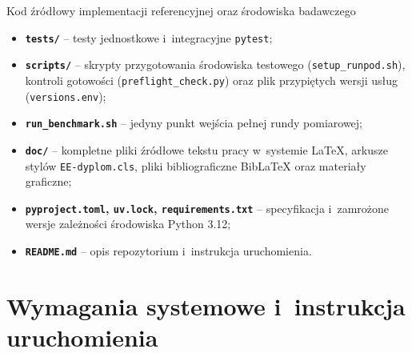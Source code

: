 \begin{easyappendix}{Kod źródłowy implementacji referencyjnej oraz środowiska badawczego}
\begin{itemize}
    \begin{itemize}
        \item \texttt{scenarios/} -- pomocnicze scenariusze pomiarowe opisane w~Rozdziale~\ref{chap:wyniki}: A (selekcja schematu i~Text-to-SQL, ablacja $M_{\text{exp}}$, czas do pierwszego tokenu, dryf schematu), B1 (transfer Out-of-Band), B2 (paginacja keyset i~postać predykatu), C1 (obciążenie współbieżne walidatora) oraz D (bezpieczeństwo);
        \item \texttt{config/benchmark\_config.json} -- jedyne źródło konfiguracji rundy (liczności, ziarna, profile modeli);
        \item \texttt{analysis\_final/}, \texttt{analysis\_offline/} -- skrypty analiz wyników rundy i~analiz wtórnych, generujące makra liczbowe pracy;
        \item \texttt{plot\_generators/} -- zautomatyzowane skrypty generujące wykresy wektorowe PDF prezentowane w~rozdziale badawczym.
    \end{itemize}
    \item \textbf{\texttt{tests/}} -- testy jednostkowe i~integracyjne \texttt{pytest};
    \item \textbf{\texttt{scripts/}} -- skrypty przygotowania środowiska testowego (\texttt{setup\_runpod.sh}), kontroli gotowości (\texttt{preflight\_check.py}) oraz plik przypiętych wersji usług (\texttt{versions.env});
    \item \textbf{\texttt{run\_benchmark.sh}} -- jedyny punkt wejścia pełnej rundy pomiarowej;
    \item \textbf{\texttt{doc/}} -- kompletne pliki źródłowe tekstu pracy w~systemie \LaTeX{}, arkusze stylów \texttt{EE-dyplom.cls}, pliki bibliograficzne Bib\LaTeX{} oraz materiały graficzne;
    \item \textbf{\texttt{pyproject.toml}, \texttt{uv.lock}, \texttt{requirements.txt}} -- specyfikacja i~zamrożone wersje zależności środowiska Python 3.12;
    \item \textbf{\texttt{README.md}} -- opis repozytorium i~instrukcja uruchomienia.
\end{itemize}

\section*{Wymagania systemowe i~instrukcja uruchomienia}


\end{easyappendix}
